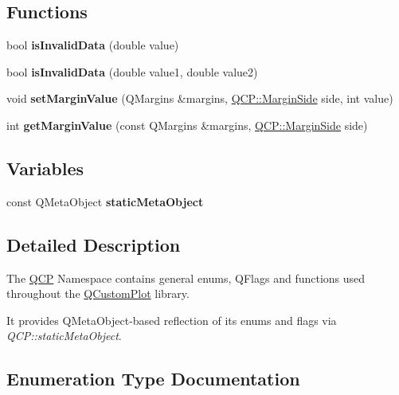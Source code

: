 \subsection*{Functions}
\begin{DoxyCompactItemize}
\item 
\mbox{\label{namespace_q_c_p_a07ab701c05329089f933b9cae2638a63}} 
bool {\bfseries is\+Invalid\+Data} (double value)
\item 
\mbox{\label{namespace_q_c_p_a728903e5c3dd17847bee280f4005496f}} 
bool {\bfseries is\+Invalid\+Data} (double value1, double value2)
\item 
\mbox{\label{namespace_q_c_p_afbf6e3084c108f2bb4372107945ee82f}} 
void {\bfseries set\+Margin\+Value} (Q\+Margins \&margins, \mbox{\hyperlink{namespace_q_c_p_a7e487e3e2ccb62ab7771065bab7cae54}{Q\+C\+P\+::\+Margin\+Side}} side, int value)
\item 
\mbox{\label{namespace_q_c_p_a23a2679d3495c444acc26acc61e35b5b}} 
int {\bfseries get\+Margin\+Value} (const Q\+Margins \&margins, \mbox{\hyperlink{namespace_q_c_p_a7e487e3e2ccb62ab7771065bab7cae54}{Q\+C\+P\+::\+Margin\+Side}} side)
\end{DoxyCompactItemize}
\subsection*{Variables}
\begin{DoxyCompactItemize}
\item 
const Q\+Meta\+Object {\bfseries static\+Meta\+Object}
\end{DoxyCompactItemize}


\subsection{Detailed Description}
The \mbox{\hyperlink{namespace_q_c_p}{Q\+CP}} Namespace contains general enums, Q\+Flags and functions used throughout the \mbox{\hyperlink{class_q_custom_plot}{Q\+Custom\+Plot}} library.

It provides Q\+Meta\+Object-\/based reflection of its enums and flags via {\itshape Q\+C\+P\+::static\+Meta\+Object}. 

\subsection{Enumeration Type Documentation}
\mbox{\label{namespace_q_c_p_ae55dbe315d41fe80f29ba88100843a0c}} 
